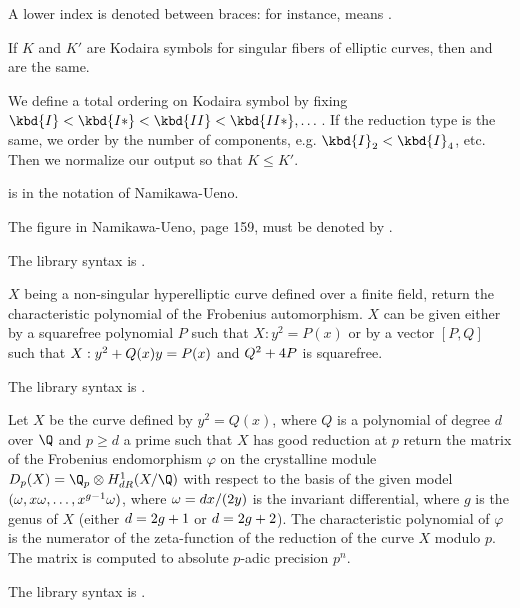 \item A lower index is denoted between braces: for instance,
  means \kbd{[I\_2-II-5]}.

\item If $K$ and $K'$ are Kodaira symbols for singular fibers of elliptic
curves, then \kbd{[$K$-$K'$-m]} and \kbd{[$K'$-$K$-m]} are the same.

We define a total ordering on Kodaira symbol by fixing $\kbd{I} < \kbd{I*} <
\kbd{II} < \kbd{II*}, \dots$. If the reduction type is the same, we order by
the number of components, e.g. $\kbd{I}_2 < \kbd{I}_4$, etc.
Then we normalize our output so that $K \leq K'$.

\item \kbd{[$K$-$K'$-$-1$]}  is \kbd{[$K$-$K'$-$\alpha$]} in the notation of
Namikawa-Ueno.

\item The figure \kbd{[2I\_0-m]} in Namikawa-Ueno, page 159, must be denoted
by \kbd{[2I\_0-(m+1)]}.

The library syntax is .

\label{se:hyperellcharpoly}
$X$ being a non-singular hyperelliptic curve defined over a finite field,
return the characteristic polynomial of the Frobenius automorphism.
$X$ can be given either by a squarefree polynomial $P$ such that
$X: y^2 = P(x)$ or by a vector $[P,Q]$ such that
$X: y^2 + Q(x)\*y = P(x)$ and $Q^2+4\*P$ is squarefree.

The library syntax is .

\label{se:hyperellpadicfrobenius}
Let $X$ be the curve defined by $y^2=Q(x)$, where  $Q$ is a polynomial of
degree $d$ over $\Q$ and $p\ge d$ a prime such that $X$ has good reduction
at $p$ return the matrix of the Frobenius endomorphism $\varphi$ on the
crystalline module $D_p(X) = \Q_p \otimes H^1_{dR}(X/\Q)$ with respect to the
basis of the given model $(\omega, x\*\omega,\ldots,x^{g-1}\*\omega)$, where
$\omega = dx/(2\*y)$ is the invariant differential, where $g$ is the genus of
$X$ (either $d=2\*g+1$ or $d=2\*g+2$).  The characteristic polynomial of
$\varphi$ is the numerator of the zeta-function of the reduction of the curve
$X$ modulo $p$. The matrix is computed to absolute $p$-adic precision $p^n$.

The library syntax is .

